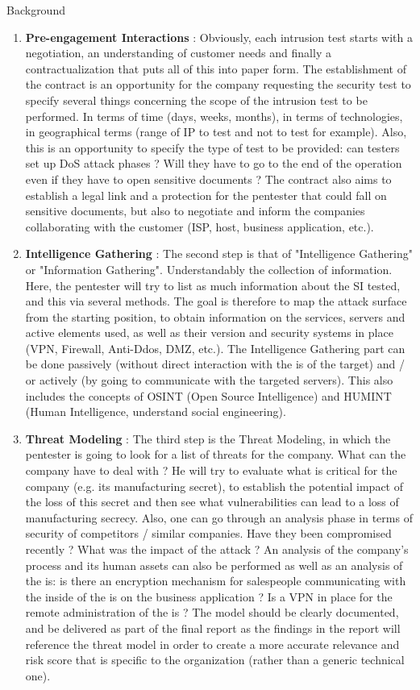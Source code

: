 \begin{chaptercover}{Background}
\begin{enumerate}
  \item \textbf{Pre-engagement Interactions} : Obviously, each intrusion test starts with a negotiation, an understanding of customer needs and finally a contractualization that puts all of this into paper form. The establishment of the contract is an opportunity for the company requesting the security test to specify several things concerning the scope of the intrusion test to be performed. In terms of time (days, weeks, months), in terms of technologies, in geographical terms (range of IP to test and not to test for example). Also, this is an opportunity to specify the type of test to be provided: can testers set up DoS attack phases ? Will they have to go to the end of the operation even if they have to open sensitive documents ? The contract also aims to establish a legal link and a protection for the pentester that could fall on sensitive documents, but also to negotiate and inform the companies collaborating with the customer (ISP, host, business application, etc.).
  \item \textbf{Intelligence Gathering} : The second step is that of "Intelligence Gathering" or "Information Gathering". Understandably the collection of information. Here, the pentester will try to list as much information about the SI tested, and this via several methods. The goal is therefore to map the attack surface from the starting position, to obtain information on the services, servers and active elements used, as well as their version and security systems in place (VPN, Firewall, Anti-Ddos, DMZ, etc.). The Intelligence Gathering part can be done passively (without direct interaction with the \acrshort{is} of the target) and / or actively (by going to communicate with the targeted servers). This also includes the concepts of OSINT (Open Source Intelligence) and HUMINT (Human Intelligence, understand social engineering).
  \item \textbf{Threat Modeling} : The third step is the Threat Modeling, in which the pentester is going to look for a list of threats for the company. What can the company have to deal with ? He will try to evaluate what is critical for the company (e.g. its manufacturing secret), to establish the potential impact of the loss of this secret and then see what vulnerabilities can lead to a loss of manufacturing secrecy. Also, one can go through an analysis phase in terms of security of competitors / similar companies. Have they been compromised recently ? What was the impact of the attack ? An analysis of the company's process and its human assets can also be performed as well as an analysis of the \acrshort{is}: is there an encryption mechanism for salespeople communicating with the inside of the \acrshort{is} on the business application ? Is a VPN in place for the remote administration of the \acrshort{is} ? The model should be clearly documented, and be delivered as part of the final report as the findings in the report will reference the threat model in order to create a more accurate relevance and risk score that is specific to the organization (rather than a generic technical one).

\end{enumerate}
\end{chaptercover}
